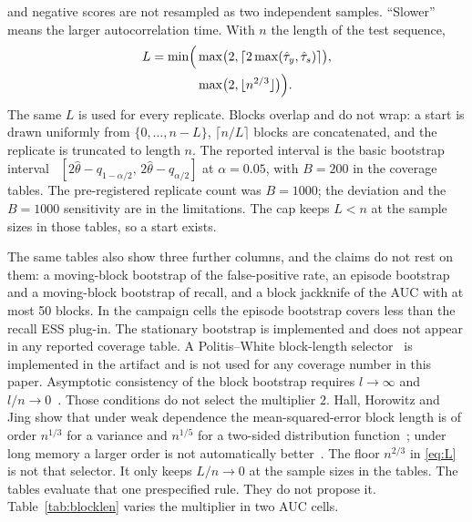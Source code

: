 \documentclass[a4paper,fleqn]{cas-dc}
\begin{document}
\begin{itemize}
and negative scores are not resampled as two independent samples. ``Slower'' means the larger
autocorrelation time. With $n$ the length of the test sequence,
\begin{equation}
\begin{aligned}
L = \min\Bigl(&\max\bigl(2,\lceil 2\max(\hat\tau_y,\hat\tau_s)\rceil\bigr),\\
&\max\bigl(2,\lfloor n^{2/3}\rfloor\bigr)\Bigr).
\end{aligned}
\label{eq:L}
\end{equation}
The same $L$ is used for every replicate. Blocks overlap and do not wrap: a start is drawn
uniformly from $\{0,\ldots,n-L\}$, $\lceil n/L\rceil$ blocks are concatenated, and the replicate is
truncated to length $n$. The reported interval is the basic bootstrap interval~\citep{davison1997bootstrap}
$[2\hat\theta-q_{1-\alpha/2},\,2\hat\theta-q_{\alpha/2}]$ at $\alpha=0.05$, with $B{=}200$ in the
coverage tables. The pre-registered replicate count was $B{=}1000$; the deviation and the
$B{=}1000$ sensitivity are in the limitations. The cap keeps $L<n$ at the sample sizes in those
tables, so a start exists.
\end{itemize}
The same tables also show three further columns, and the claims do not rest on them: a moving-block
bootstrap of the false-positive rate, an episode bootstrap and a moving-block bootstrap of recall,
and a block jackknife of the AUC with at most 50 blocks. In the campaign cells the episode
bootstrap covers less than the recall ESS plug-in. The stationary bootstrap is implemented and does
not appear in any reported coverage table. A Politis--White block-length
selector~\citep{politis2004automatic,patton2009correction} is implemented in
the artifact and is not used for any coverage number in this paper. Asymptotic consistency of the
block bootstrap requires $l\to\infty$ and $l/n\to0$~\citep{kunsch1989jackknife,dehling2010ustat}.
Those conditions do not select the multiplier $2$. Hall, Horowitz and Jing show that under weak
dependence the mean-squared-error block length is of order $n^{1/3}$ for a variance and $n^{1/5}$ for
a two-sided distribution function~\citep{hall1995blocking}; under long memory a larger order is not
automatically better~\citep{zhang2022block}. The floor $n^{2/3}$ in \eqref{eq:L}
is not that selector. It only keeps $L/n\to0$ at the sample sizes in the tables. The tables evaluate that one prespecified rule.
They do not propose it. Table~\ref{tab:blocklen} varies the multiplier in two AUC cells.
\end{document}
